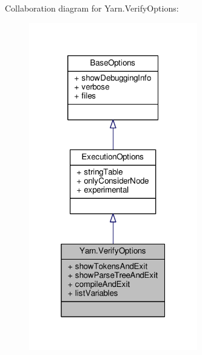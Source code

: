Collaboration diagram for Yarn.\-Verify\-Options\-:
\nopagebreak
\begin{figure}[H]
\begin{center}
\leavevmode
\includegraphics[width=208pt]{a00721}
\end{center}
\end{figure}
